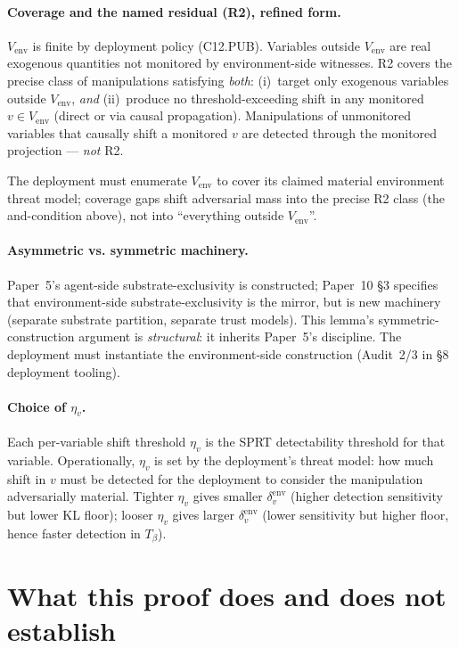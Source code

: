 \documentclass{article}
\newcommand{\Tbeta}{T_{\beta}}
\newcommand{\Vem}{V_{\mathrm{env}}}
\begin{document}
\paragraph{Coverage and the named residual (R2), refined form.}
$\Vem$ is finite by deployment policy (C12.PUB).  Variables outside
$\Vem$ are real exogenous quantities not monitored by
environment-side witnesses.  R2 covers the precise class of
manipulations satisfying \emph{both}:
(i)~target only exogenous variables outside $\Vem$, \emph{and}
(ii)~produce no threshold-exceeding shift in any monitored
$v \in \Vem$ (direct or via causal propagation).  Manipulations of
unmonitored variables that causally shift a monitored $v$ are
detected through the monitored projection — \emph{not} R2.

The deployment must enumerate $\Vem$ to cover its claimed material
environment threat model; coverage gaps shift adversarial mass into
the precise R2 class (the and-condition above), not into
``everything outside $\Vem$''.

\paragraph{Asymmetric vs. symmetric machinery.}
Paper~5's agent-side substrate-exclusivity is constructed; Paper~10
§3 specifies that environment-side substrate-exclusivity is the
mirror, but is new machinery (separate substrate partition, separate
trust models).  This lemma's symmetric-construction argument is
\emph{structural}: it inherits Paper~5's discipline.  The
deployment must instantiate the environment-side construction
(Audit~2/3 in §8 deployment tooling).

\paragraph{Choice of $\eta_v$.}
Each per-variable shift threshold $\eta_v$ is the SPRT
detectability threshold for that variable.  Operationally, $\eta_v$
is set by the deployment's threat model: how much shift in $v$
must be detected for the deployment to consider the manipulation
adversarially material.  Tighter $\eta_v$ gives smaller
$\delta_v^{\mathrm{env}}$ (higher detection sensitivity but lower
KL floor); looser $\eta_v$ gives larger $\delta_v^{\mathrm{env}}$
(lower sensitivity but higher floor, hence faster detection in
$\Tbeta$).

\section{What this proof does and does not establish}
\end{document}
